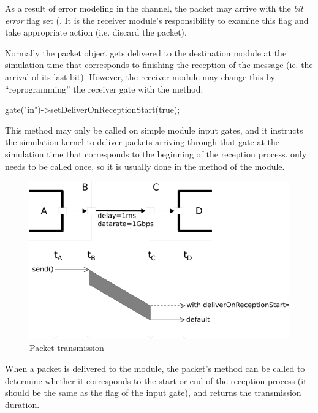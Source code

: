 As a result of error modeling in the channel, the packet may arrive
with the \textit{bit error} flag set (.
It is the receiver module's responsibility to examine this flag
and take appropriate action (i.e. discard the packet).

Normally the packet object gets delivered to the destination module
at the simulation time that corresponds to finishing the reception
of the message (ie. the arrival of its last bit). However, the receiver
module may change this by ``reprogramming'' the receiver gate with
the  method:

\begin{cpp}
gate("in")->setDeliverOnReceptionStart(true);
\end{cpp}

This method may only be called on simple module input gates, and it
instructs the simulation kernel to deliver packets arriving through
that gate at the simulation time that corresponds to the
beginning of the reception process.
 only needs to be called once,
so it is usually done in the  method of the module.

\begin{figure}[htbp]
\begin{center}
\includegraphics{figures/transmission}
\caption{Packet transmission}
\label{fig:ch-simple-modules:transmission}
\end{center}
\end{figure}

When a packet is delivered to the module, the packet's
 method can be called to determine
whether it corresponds to the start or end of the reception
process (it should be the same as the 
flag of the input gate), and  returns the transmission
duration.

